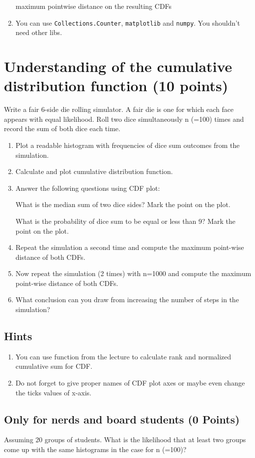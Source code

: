 \documentclass{WeSTassignment}
\begin{document}
\begin{enumerate}
maximum pointwise distance on the resulting CDFs
\item You can use \texttt{Collections.Counter}, \texttt{matplotlib} and \texttt{numpy}. You shouldn't need other libs. 
\end{enumerate}




\section{Understanding of the cumulative distribution function (10 points)}

Write a fair 6-side die rolling simulator. A fair die is one for which each face appears with equal likelihood. Roll two dice simultaneously n (=100) times and record the sum of both dice each time. 

\begin{enumerate}
\item Plot a readable histogram with frequencies of dice sum outcomes from the simulation. 
\item Calculate and plot cumulative distribution function.
\item Answer the following questions using CDF plot:

What is the median sum of two dice sides?  Mark the point on the plot.

What is the probability of dice sum to be equal or less than 9? Mark the point on the plot.

\item Repeat the simulation a second time and compute the maximum point-wise distance of both CDFs.
\item Now repeat the simulation (2 times) with n=1000 and compute the maximum point-wise distance of both CDFs.
\item What conclusion can you draw from increasing the number of steps in the simulation?  

\end{enumerate}


\subsection{Hints}
\begin{enumerate}
\item You can use function from the lecture to calculate rank and normalized cumulative sum for CDF.
\item Do not forget to give proper names of CDF plot axes or maybe even change the ticks values of x-axis. 
\end{enumerate}

\subsection{Only for nerds and board students (0 Points)}
Assuming 20 groups of students. What is the likelihood that at least two groups come up with the same histograms in the case for n (=100)?





\makefooter
\end{document}
